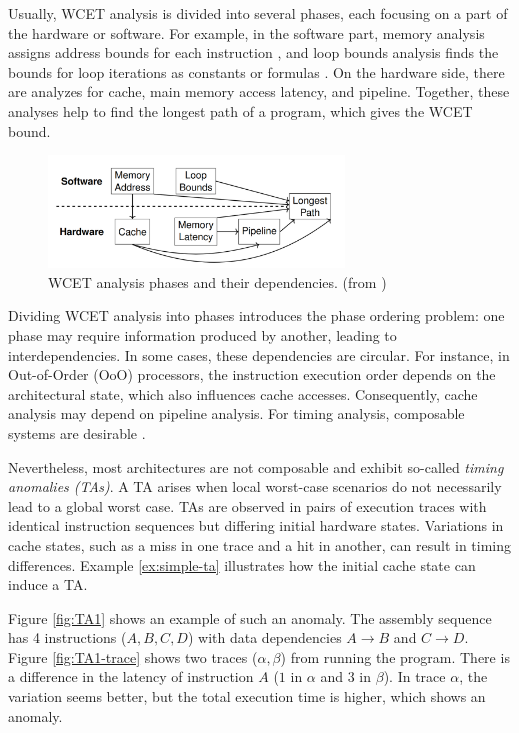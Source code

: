 Usually, WCET analysis is divided into several phases, each focusing on a part of the hardware or software. For example, in the software part, memory analysis assigns address bounds for each instruction \cite{Harrison_Ranges_1977}, and loop bounds analysis finds the bounds for loop iterations as constants or formulas \cite{Healy_bounding_1998}. On the hardware side, there are analyzes for cache, main memory access latency, and pipeline. Together, these analyses help to find the longest path of a program, which gives the WCET bound.

\begin{figure}
    \centering
    \includegraphics[width=0.7\textwidth]{figures/wcet-deps.png}
    \caption{WCET analysis phases and their dependencies. (from \cite{CAOTIC-report})}
    \label{fig:wcet-deps}
\end{figure}

Dividing WCET analysis into phases introduces the phase ordering problem: one phase may require information produced by another, leading to interdependencies. In some cases, these dependencies are circular. For instance, in Out-of-Order (OoO) processors, the instruction execution order depends on the architectural state, which also influences cache accesses. Consequently, cache analysis may depend on pipeline analysis. For timing analysis, composable systems are desirable \cite{Puschner_computing_1997}.

Nevertheless, most architectures are not composable and exhibit so-called \textit{timing anomalies (TAs)}. A TA arises when local worst-case scenarios do not necessarily lead to a global worst case. TAs are observed in pairs of execution traces with identical instruction sequences but differing initial hardware states. Variations in cache states, such as a miss in one trace and a hit in another, can result in timing differences. Example \ref{ex:simple-ta} illustrates how the initial cache state can induce a TA.

\begin{example}
Figure \ref{fig:TA1} shows an example of such an anomaly. The assembly sequence has 4 instructions ($A,B,C,D$) with data dependencies $A \rightarrow B$ and $C \rightarrow D$. Figure \ref{fig:TA1-trace} shows two traces ($\alpha, \beta$) from running the program. There is a difference in the latency of instruction $A$ ($1$ in $\alpha$ and $3$ in $\beta$). In trace $\alpha$, the variation seems better, but the total execution time is higher, which shows an anomaly.
\label{ex:simple-ta}
\end{example}

